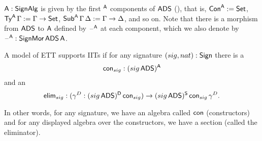 \documentclass[a4paper,UKenglish,cleveref, autoref]{lipics-v2019}
\begin{document}
\begin{definition}\label{def:a}
  $\mathsf{A} : \mathsf{SignAlg}$ is given by the first $^{\mathsf{A}}$ components of $\mathsf{ADS}$
  (), that is, $\mathsf{Con}^{\mathsf{A}} := \mathsf{Set}$,
  $\mathsf{Ty}^{\mathsf{A}}\,\Gamma := \Gamma\rightarrow\mathsf{Set}$,
  $\mathsf{Sub}^{\mathsf{A}}\,\Gamma\,\Delta := \Gamma\rightarrow\Delta$, and so on. Note that
  there is a morphism from $\mathsf{ADS}$ to $\mathsf{A}$ defined by $\mathord{\hspace{1pt}\text{--}\hspace{1pt}}^{\mathsf{A}}$ at
  each component, which we also denote by
  $\mathord{\hspace{1pt}\text{--}\hspace{1pt}}^{\mathsf{A}} : \mathsf{SignMor}\,\mathsf{ADS}\,\mathsf{A}$.
\end{definition}

\begin{definition}\label{sec:hasiits}
  A model of ETT supports IITs if for any signature $(sig,nat):\mathsf{Sign}$
  there is a
  \[
    \mathsf{con}_{sig}: ({sig}\,\mathsf{ADS})^{\mathsf{A}}
  \]
  and an
  \[
    \mathsf{elim}_{sig} : (\gamma^D:({sig}\,\mathsf{ADS})^{\mathsf{D}}\,\mathsf{con}_{sig})\rightarrow ({sig}\,\mathsf{ADS})^{\mathsf{S}}\,\mathsf{con}_{sig}\,\gamma^D.
  \]
\end{definition}
In other words, for any signature, we have an algebra called $\mathsf{con}$
(constructors) and for any displayed algebra over the constructors, we
have a section (called the eliminator).
\end{document}
